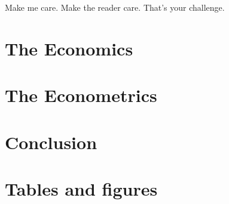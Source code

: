 \documentclass{article}
\begin{document}
Make me care.
Make the reader care. That's your challenge.




\section{The Economics}



\section{The Econometrics}



\section{Conclusion}





\newpage
\onehalfspacing



\newpage
\section*{Tables and figures}
\end{document}
